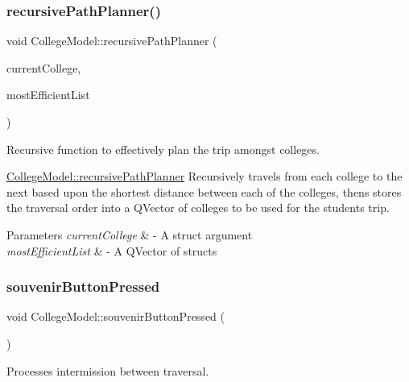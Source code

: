 \subsubsection{\texorpdfstring{recursive\+Path\+Planner()}{recursivePathPlanner()}}
{\footnotesize\ttfamily void College\+Model\+::recursive\+Path\+Planner (\begin{DoxyParamCaption}\item[{\mbox{\hyperlink{struct_college}{College}}}]{current\+College,  }\item[{Q\+Vector$<$ \mbox{\hyperlink{struct_college}{College}} $>$ \&}]{most\+Efficient\+List }\end{DoxyParamCaption})}



Recursive function to effectively plan the trip amongst colleges. 

\mbox{\hyperlink{class_college_model_a95322085a90304da8cbb265c80a3c3aa}{College\+Model\+::recursive\+Path\+Planner}} Recursively travels from each college to the next based upon the shortest distance between each of the colleges, thens stores the traversal order into a Q\+Vector of colleges to be used for the student\textquotesingle{}s trip.


\begin{DoxyParams}{Parameters}
{\em current\+College} & -\/ A struct argument \\
\hline
{\em most\+Efficient\+List} & -\/ A Q\+Vector of structs \\
\hline
\end{DoxyParams}
\mbox{\label{class_college_model_a77fd4ae5151724440b68f236305ff74e}} 
\subsubsection{\texorpdfstring{souvenir\+Button\+Pressed}{souvenirButtonPressed}}
{\footnotesize\ttfamily void College\+Model\+::souvenir\+Button\+Pressed (\begin{DoxyParamCaption}{ }\end{DoxyParamCaption})\hspace{0.3cm}{\ttfamily [slot]}}



Processes intermission between traversal. 

